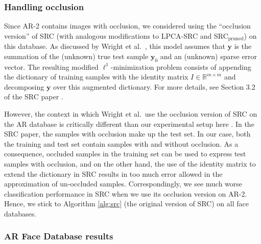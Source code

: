 \documentclass[review]{elsarticle}
\begin{document}
\subsubsection{Handling occlusion} \label{sec:occ}

Since AR-2 contains images with occlusion, we considered using the ``occlusion version'' of SRC (with analogous modifications to LPCA-SRC and SRC$_\mathrm{pruned}$) on this database. As discussed by Wright et al.\ \cite{wri:src}, this model assumes that $\bm{y}$ is the summation of the (unknown) true test sample $\bm{y}_0$ and an (unknown) sparse error vector. The resulting modified $\ell^1$-minimization problem consists of appending the dictionary of training samples with the identity matrix $I \in \mathbb{R}^{m\times m}$ and decomposing $\bm{y}$ over this augmented dictionary. For more details, see Section 3.2 of the SRC paper \cite{wri:src}.


However, the context in which Wright et al.\ use the occlusion version of SRC on the AR database is critically different than our experimental setup here \cite{wri:src}. In the SRC paper, the samples with occlusion make up the test set. In our case, both the training and test set contain samples with and without occlusion. As a consequence, occluded samples in the training set can be used to express test samples with occlusion, and on the other hand, the use of the identity matrix to extend the dictionary in SRC results in too much error allowed in the approximation of un-occluded samples. Correspondingly, we see much worse classification performance in SRC when we use its occlusion version on AR-2. Hence, we stick to Algorithm \ref{alg:src} (the original version of SRC) on all face databases.






\subsubsection{AR Face Database results} \label{sec:AR}
\end{document}
